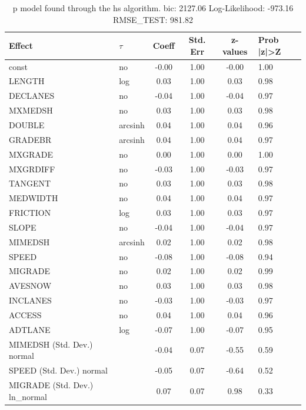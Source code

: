 \begin{table}
	\caption{p model found through the hs algorithm. bic: 2127.06 Log-Likelihood: -973.16 RMSE_TEST: 981.82}
	\begin{center}
		\begin{tabular}{|l|l|c|c|c|l|}
			\hline
			Effect & $\tau$ & Coeff & Std. Err & z-values & Prob |z|>Z \\
			\hline
			const & no & -0.00 & 1.00 & -0.00 & 1.00 \\
			\hline
			LENGTH & log & 0.03 & 1.00 & 0.03 & 0.98 \\
			\hline
			DECLANES & no & -0.04 & 1.00 & -0.04 & 0.97 \\
			\hline
			MXMEDSH & no & 0.03 & 1.00 & 0.03 & 0.98 \\
			\hline
			DOUBLE & arcsinh & 0.04 & 1.00 & 0.04 & 0.96 \\
			\hline
			GRADEBR & arcsinh & 0.04 & 1.00 & 0.04 & 0.97 \\
			\hline
			MXGRADE & no & 0.00 & 1.00 & 0.00 & 1.00 \\
			\hline
			MXGRDIFF & no & -0.03 & 1.00 & -0.03 & 0.97 \\
			\hline
			TANGENT & no & 0.03 & 1.00 & 0.03 & 0.98 \\
			\hline
			MEDWIDTH & no & 0.04 & 1.00 & 0.04 & 0.97 \\
			\hline
			FRICTION & log & 0.03 & 1.00 & 0.03 & 0.97 \\
			\hline
			SLOPE & no & -0.04 & 1.00 & -0.04 & 0.97 \\
			\hline
			MIMEDSH & arcsinh & 0.02 & 1.00 & 0.02 & 0.98 \\
			\hline
			SPEED & no & -0.08 & 1.00 & -0.08 & 0.94 \\
			\hline
			MIGRADE & no & 0.02 & 1.00 & 0.02 & 0.99 \\
			\hline
			AVESNOW & no & 0.03 & 1.00 & 0.03 & 0.98 \\
			\hline
			INCLANES & no & -0.03 & 1.00 & -0.03 & 0.97 \\
			\hline
			ACCESS & no & 0.04 & 1.00 & 0.04 & 0.96 \\
			\hline
			ADTLANE & log & -0.07 & 1.00 & -0.07 & 0.95 \\
			\hline
			MIMEDSH (Std. Dev.) normal &  & -0.04 & 0.07 & -0.55 & 0.59 \\
			\hline
			SPEED (Std. Dev.) normal &  & -0.05 & 0.07 & -0.64 & 0.52 \\
			\hline
			MIGRADE (Std. Dev.) ln_normal &  & 0.07 & 0.07 & 0.98 & 0.33 \\

\end{tabular}
\end{center}
\end{table}
